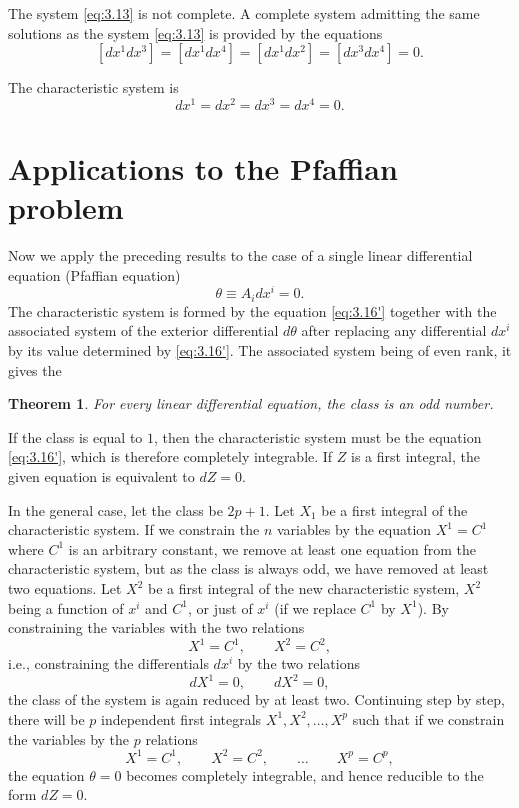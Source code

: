 \documentclass[leqno,11pt]{book}
\numberwithin{equation}{chapter}
\theoremstyle{shape1}
\newtheorem*{thm*}{\hspace{15pt}Theorem}
\theoremstyle{shape0}
\theoremstyle{shape2}
\theoremstyle{definition}
\begin{document}
The system \eqref{eq:3.13} is not complete. A complete system admitting the same solutions as the system \eqref{eq:3.13} is provided by the equations
\begin{equation}
  \label{eq:3.15}
  [dx^{1}dx^{3}]=[dx^{1}dx^{4}]=[dx^{1}dx^{2}]=[dx^{3}dx^{4}]=0.
\end{equation}

The characteristic system is
\[
dx^{1}=dx^{2}=dx^{3}=dx^{4}=0.
\]

\section{Applications to the Pfaffian problem}
\label{sec:appl-pfaff-probl}
\fsec Now we apply the preceding results to the case of a single linear differential equation (Pfaffian equation)
\begin{equation}
  \label{eq:3.16'}
  \theta\equiv A_{i}dx^{i}=0.
\end{equation}
The characteristic system is formed by the equation \eqref{eq:3.16'} together with the associated system of the exterior differential $d\theta$ after replacing any differential $dx^{i}$ by its value determined by \eqref{eq:3.16'}. The associated system being of even rank, it gives the

\begin{thm*}
  For every linear differential equation, the class is an odd number.
\end{thm*}

If the class is equal to $1$, then the characteristic system must be the equation \eqref{eq:3.16'}, which is therefore completely integrable. If $Z$ is a first integral, the given equation is equivalent to $dZ=0$.

In the general case, let the class be $2p+1$. Let $X_{1}$ be a  first integral of the characteristic system. If we constrain the $n$ variables by the equation $X^{1}=C^{1}$ where $C^{1}$ is an arbitrary constant, we remove at least one equation from the characteristic system, but as the class is always odd, we have removed at least two equations.  Let $X^{2}$ be a first integral of the new characteristic system, $X^{2}$ being a function of $x^{i}$ and $C^{1}$, or just of $x^{i}$ (if we replace $C^{1}$ by $X^{1}$). By constraining the variables with the two relations
\[
X^{1}=C^{1},\qquad X^{2}=C^{2},
\]
{i.e.}, constraining the differentials $dx^{i}$ by the two relations
\[
dX^{1}=0,\qquad dX^{2}=0,
\]
the class of the system is again reduced by at least two. Continuing step by step,  there will be $p$ independent first integrals $X^{1},X^{2},\dots,X^{p}$ such that if we constrain the variables by the $p$ relations
\[
X^{1}=C^{1},\qquad X^{2}=C^{2},\qquad\dots\qquad X^{p}=C^{p},
\]
the equation $\theta=0$ becomes completely integrable, and hence reducible to the form $dZ=0$.
\end{document}
